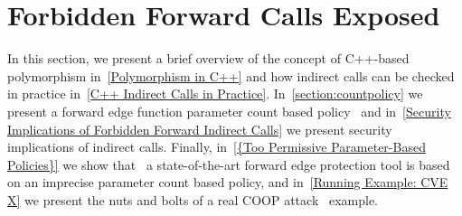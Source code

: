 \section{Forbidden Forward Calls Exposed}
\label{C++ Bad Forward Indirect Calls}
In this section,
we present a brief overview of the concept of C++-based polymorphism in~\cref{Polymorphism in C++}
and how indirect calls can be checked in practice in~\cref{C++ Indirect Calls in Practice}.
In~\cref{section:countpolicy} we present a forward edge function parameter count based policy~\cite{veen:typearmor} 
and in~\cref{Security Implications of Forbidden Forward Indirect Calls} we present security implications of indirect calls.
Finally, in~\cref{{Too Permissive Parameter-Based Policies}} we show that~\cite{veen:typearmor} a state-of-the-art 
forward edge protection tool is based on an imprecise parameter count based policy, and 
in~\cref{Running Example: CVE X} we present the nuts and bolts of a real COOP attack~\cite{schuster:coop} example.

